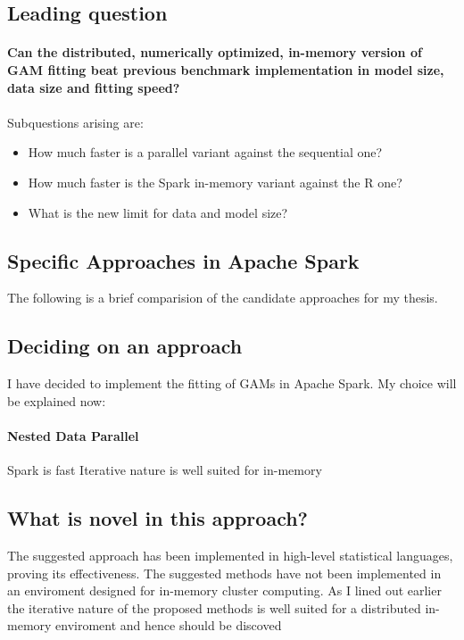 \message{ !name(expose.tex)}\documentclass{article}
\begin{document}
    \subsection{Leading question}

    \paragraph{Can the distributed, numerically optimized, in-memory version of GAM fitting beat previous benchmark implementation in model size, data size and fitting speed?}

    \paragraph{}
    Subquestions arising are:
        \begin{itemize}
        \item How much faster is a parallel variant against the sequential one?
        \item How much faster is the Spark in-memory variant against the R one?
        \item What is the new limit for data and model size?
        \end{itemize}

    \subsection{Specific Approaches in Apache Spark}
    The following is a brief comparision of the candidate approaches for my thesis.




    \subsection{Deciding on an approach}

    I have decided to implement the fitting of GAMs in Apache Spark. My choice will be explained now:
    \paragraph{Nested Data Parallel}
        Spark is fast
        Iterative nature is well suited for in-memory



    \subsection{What is novel in this approach?}
    The suggested approach has been implemented in high-level statistical languages, proving its effectiveness. The suggested methods have not been implemented in an enviroment designed for in-memory cluster computing. As I lined out earlier the iterative nature of the proposed methods is well suited for a distributed in-memory enviroment and hence should be discoved
\end{document}
